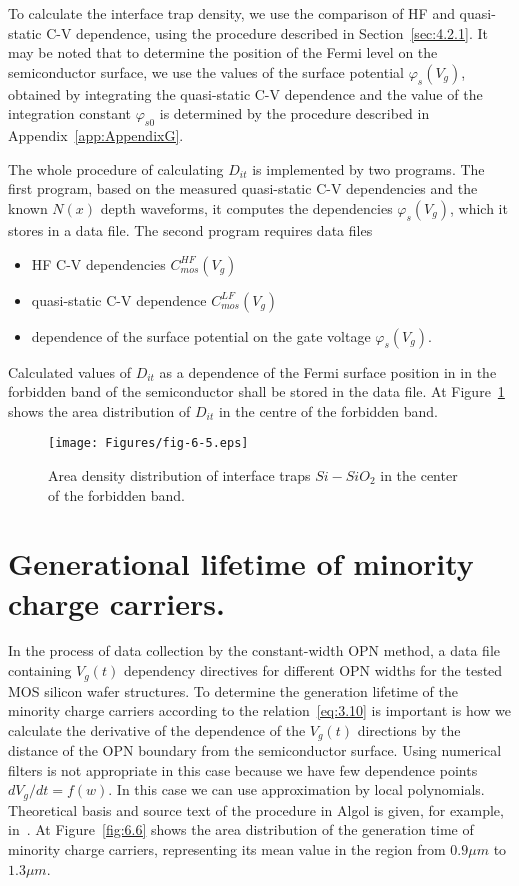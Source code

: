 To calculate the interface trap density, we use the comparison of HF and
quasi-static C-V dependence, using the procedure described in
Section~\ref{sec:4.2.1}. It may be noted that to determine the position of the Fermi
level on the semiconductor surface, we use the values of the surface potential
$\varphi_{s}(V_{g})$, obtained by integrating the quasi-static C-V
dependence and the value of the integration constant $\varphi_{s0}$ is determined
by the procedure described in Appendix~\ref{app:AppendixG}.

The whole procedure of calculating $D_{it}$ is implemented by two
programs. The first program, based on the measured quasi-static C-V
dependencies and the known $N(x)$ depth waveforms, it computes the
dependencies $\varphi_{s}(V_{g})$, which it stores in a data file. The
second program requires data files

\begin{itemize}
\item HF C-V dependencies $C_{mos}^{HF}(V_{g})$
\item quasi-static C-V dependence $C_{mos}^{LF}(V_{g})$
\item dependence of the surface potential on the gate voltage $\varphi_{s}(V_{g})$.
\end{itemize}

Calculated values of $D_{it}$ as a dependence of the Fermi surface
position in in the forbidden band of the semiconductor shall be stored
in the data file. At Figure~\ref{fig:6.5} shows the area distribution
of $D_{it}$ in the centre of the forbidden band.

\begin{figure}[h!]\centering
  \texttt{[image: Figures/fig-6-5.eps]}
  \caption[Area density distribution of $Si-SiO_{2}$ interface traps
    in center of the forbidden band]{Area density distribution of
    interface traps $Si-SiO_{2}$ in the center of the forbidden
    band.}\label{fig:6.5}
\end{figure}

\section{Generational lifetime of minority charge carriers.}\label{sec:6.4}

In the process of data collection by the constant-width OPN method, a
data file containing $V_{g}(t)$ dependency directives for different
OPN widths for the tested MOS silicon wafer structures. To determine
the generation lifetime of the minority charge carriers according to
the relation~\ref{eq:3.10} is important is how we calculate the
derivative of the dependence of the $V_{g}(t)$ directions by the
distance of the OPN boundary from the semiconductor surface. Using
numerical filters is not appropriate in this case because we have few
dependence points $dV_{g}/dt = f(w)$. In this case we can use
approximation by local polynomials. Theoretical basis and source text
of the procedure in Algol is given, for example, in~\cite{6.1}. At
Figure~\ref{fig:6.6} shows the area distribution of the generation
time of minority charge carriers, representing its mean value in the
region from $0.9\mu m$ to $1.3\mu m$.

